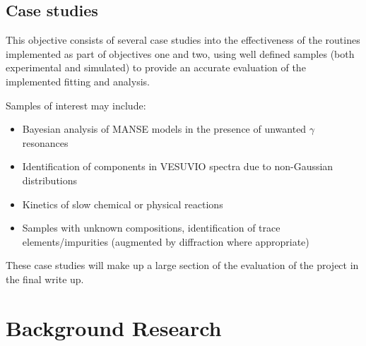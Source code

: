 \documentclass[a4paper,11pt]{article}
\begin{document}
\subsection{Case studies}
\label{sec:objective3}

This objective consists of several case studies into the effectiveness of the
routines implemented as part of objectives one and two, using well defined
samples (both experimental and simulated) to provide an accurate evaluation of
the implemented fitting and analysis.

Samples of interest may include:

\begin{itemize}
  \itemsep 0em
  \item Bayesian analysis of MANSE models in the presence of unwanted $\gamma$
        resonances
  \item Identification of components in VESUVIO spectra due to non-Gaussian
        distributions
  \item Kinetics of slow chemical or physical reactions
  \item Samples with unknown compositions, identification of trace
        elements/impurities (augmented by diffraction where appropriate)
\end{itemize}

These case studies will make up a large section of the evaluation of the project
in the final write up.

\section{Background Research}
\label{sec:background}
\end{document}
